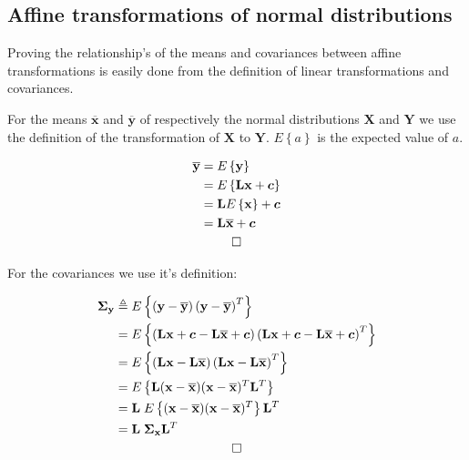 \begin{appendices}
\section{\label{APP:affinenormal}Affine transformations of normal distributions}
Proving the relationship's of the means and covariances between affine transformations is easily done from the definition of linear transformations and covariances.

For the means $\overline{\mathbf{x}}$ and $\overline{\mathbf{y}}$ of respectively the normal distributions $\mathbf{X}$ and $\mathbf{Y}$ we use the definition of the transformation of $\mathbf{X}$ to $\mathbf{Y}$. $E\left\{ a \right\}$ is the expected value of $a$.

\begin{align}
	\overline{\mathbf{y}} &= E\left\{ \mathbf{y} \right\}\nonumber\\
	&=E\left\{ \mathbf{L}\mathbf{x} + \bm{c} \right\}\nonumber\\
	&=\mathbf{L}E\left\{ \mathbf{x}  \right\}+ \bm{c}\nonumber\\
	&=\mathbf{L}	\overline{\mathbf{x}}+ \bm{c}\\
	\square \span \nonumber
\end{align}

For the covariances we use it's definition:

\begin{align}
	\mathbf{\Sigma}_\mathbf{y} 
	&\triangleq 
	E\left\{ 
		\left( \mathbf{y} -  \overline{\mathbf{y}} \right) 
		\left( \mathbf{y} -  \overline{\mathbf{y}} \right)^T
	\right\} \nonumber \\
	&= 
	E\left\{ 
	\left( \mathbf{L}\mathbf{x} + \bm{c} -   \mathbf{L}\overline{\mathbf{x}} + \bm{c} \right) 
	\left( \mathbf{L}\mathbf{x} + \bm{c} -   \mathbf{L}\overline{\mathbf{x}} + \bm{c} \right)^T
	\right\}  \nonumber \\
	&= 
	E\left\{ 
	\left( \mathbf{L}\mathbf{x} -   \mathbf{L}\overline{\mathbf{x}} \right) 
	\left( \mathbf{L}\mathbf{x} -   \mathbf{L}\overline{\mathbf{x}} \right)^T
	\right\} \nonumber \\
	&= 
	E\left\{ 
	\mathbf{L}(\mathbf{x} - \overline{\mathbf{x}})  
	(\mathbf{x} - \overline{\mathbf{x}} )^T \mathbf{L}^T
	\right\} \nonumber \\
	&= 
	\mathbf{L}\;
	E\left\{ 
	(\mathbf{x} - \overline{\mathbf{x}})  
	(\mathbf{x} - \overline{\mathbf{x}} )^T 
	\right\} 
	\mathbf{L}^T \nonumber \\
	&= 
	\mathbf{L}\;
	\mathbf{\Sigma}_\mathbf{x} 
	\mathbf{L}^T\\
	\square \span \nonumber 
\end{align}

\end{appendices}